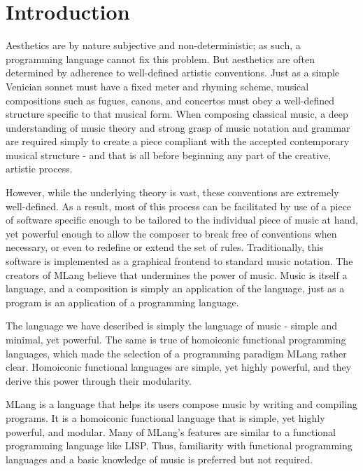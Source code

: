 \documentclass[letterpaper,11pt]{article}
\begin{document}

\section{Introduction}

Aesthetics are by nature subjective and non-deterministic; as such, a programming language cannot fix this problem. But aesthetics are often determined by adherence to well-defined artistic conventions. Just as a simple Venician sonnet must have a fixed meter and rhyming scheme, musical compositions such as fugues, canons, and concertos must obey a well-defined structure specific to that musical form. When composing classical music, a deep understanding of music theory and strong grasp of music notation and grammar are required simply to create a piece compliant with the accepted contemporary musical structure - and that is all before beginning any part of the creative, artistic process. 

However, while the underlying theory is vast, these conventions are extremely well-defined. As a result, most of this process can be facilitated by use of a piece of software specific enough to be tailored to the individual piece of music at hand, yet powerful enough to allow the composer to break free of conventions when necessary, or even to redefine or extend the set of rules. Traditionally, this software is implemented as a graphical frontend to standard music notation. The creators of MLang believe that undermines the power of music. Music is itself a language, and a composition is simply an application of the language, just as a program is an application of a programming language.

The language we have described is simply the language of music - simple and minimal, yet powerful. The same is true of homoiconic functional programming languages, which made the selection of a programming paradigm MLang rather clear. Homoiconic functional languages are simple, yet highly powerful, and they derive this power through their modularity.

MLang is a language that helps its users compose music by writing and compiling programs. It is a homoiconic functional language that is simple,
yet highly powerful, and modular. Many of MLang's features are similar to a functional programming language like LISP. 
Thus, familiarity with functional programming languages and a basic knowledge of music is preferred but not required.
\end{document}
